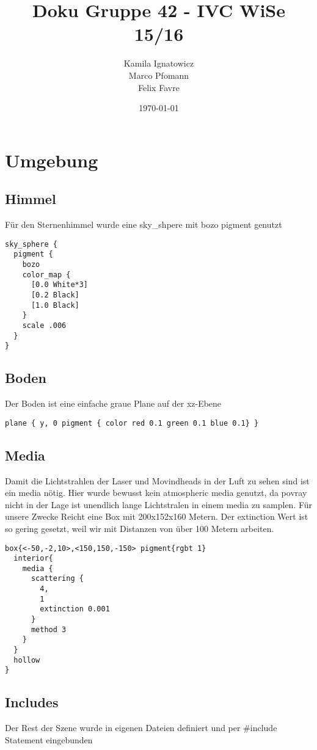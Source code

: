 \documentclass[paper=a4]{scrartcl}
\begin{document}
\title{Doku Gruppe 42 - IVC WiSe 15/16}
\author{Kamila Ignatowicz\\ Marco Pfomann \\ Felix Favre}
\date{\today}
\maketitle

\section{Umgebung}
\subsection{Himmel}
Für den Sternenhimmel wurde eine sky\_shpere mit bozo pigment genutzt
\begin{lstlisting}
sky_sphere {
  pigment {
    bozo
    color_map {
      [0.0 White*3]
      [0.2 Black]
      [1.0 Black]
    }
    scale .006
  }
}
\end{lstlisting}

\subsection{Boden}
Der Boden ist eine einfache graue Plane auf der xz-Ebene
\begin{lstlisting}
plane { y, 0 pigment { color red 0.1 green 0.1 blue 0.1} }
\end{lstlisting}

\subsection{Media}
Damit die Lichtstrahlen der Laser und Movindheads in der Luft zu sehen sind ist ein media nötig. Hier wurde bewusst kein atmospheric media genutzt, da povray nicht in der Lage ist unendlich lange Lichtstralen in einem media zu samplen.
Für unsere Zwecke Reicht eine Box mit 200x152x160 Metern.
Der extinction Wert ist so gering gesetzt, weil wir mit Distanzen von über 100 Metern arbeiten.
\begin{lstlisting}
box{<-50,-2,10>,<150,150,-150> pigment{rgbt 1}
  interior{
    media {
      scattering {
        4,
        1
        extinction 0.001
      }
      method 3
    }
  }
  hollow
}
\end{lstlisting}

\subsection{Includes}
Der Rest der Szene wurde in eigenen Dateien definiert und per \#include Statement eingebunden
\end{document}
